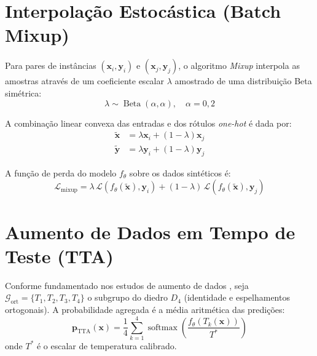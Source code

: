 \documentclass[oneside,english,brazilian]{UNISINOSmonografia}
\begin{document}
\section{Interpolação Estocástica (Batch Mixup)}
\label{sec:apendice_mixup}

Para pares de instâncias $(\mathbf{x}_i, \mathbf{y}_i)$ e $(\mathbf{x}_j, \mathbf{y}_j)$, o algoritmo \textit{Mixup} \cite{zhang2018mixup} interpola as amostras através de um coeficiente escalar $\lambda$ amostrado de uma distribuição Beta simétrica:
\begin{equation}
    \label{eq:apendice_mixup_beta}
    \lambda \sim \operatorname{Beta}(\alpha, \alpha), \quad \alpha = 0{,}2
\end{equation}

A combinação linear convexa das entradas e dos rótulos \textit{one-hot} é dada por:
\begin{align}
    \tilde{\mathbf{x}} &= \lambda \mathbf{x}_i + (1 - \lambda) \mathbf{x}_j \label{eq:apendice_mixup_input} \\
    \tilde{\mathbf{y}} &= \lambda \mathbf{y}_i + (1 - \lambda) \mathbf{y}_j \label{eq:apendice_mixup_label}
\end{align}

A função de perda do modelo $f_\theta$ sobre os dados sintéticos é:
\begin{equation}
    \label{eq:apendice_mixup_loss}
    \mathcal{L}_{\text{mixup}} = \lambda \, \mathcal{L}\left(f_\theta(\tilde{\mathbf{x}}), \mathbf{y}_i\right) + (1 - \lambda) \, \mathcal{L}\left(f_\theta(\tilde{\mathbf{x}}), \mathbf{y}_j\right)
\end{equation}

\section{Aumento de Dados em Tempo de Teste (TTA)}
\label{sec:apendice_tta}

Conforme fundamentado nos estudos de aumento de dados \cite{shorten2019survey}, seja $\mathcal{G}_{\text{ort}} = \{T_1, T_2, T_3, T_4\}$ o subgrupo do diedro $D_4$ (identidade e espelhamentos ortogonais). A probabilidade agregada é a média aritmética das predições:
\begin{equation}
    \label{eq:apendice_tta}
    \mathbf{p}_{\text{TTA}}(\mathbf{x}) = \frac{1}{4} \sum_{k=1}^4 \operatorname{softmax}\left( \frac{f_\theta(T_k(\mathbf{x}))}{T^*} \right)
\end{equation}
onde $T^*$ é o escalar de temperatura calibrado.
\end{document}
